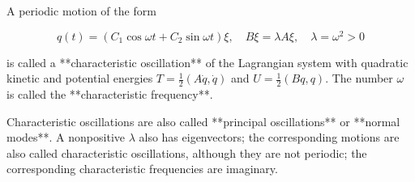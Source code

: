 A periodic motion of the form

$$q(t) = (C_1 \cos \omega t + C_2 \sin \omega t) \xi, \quad B\xi = \lambda A\xi, \quad \lambda = \omega^2 > 0$$

is called a **characteristic oscillation** of the Lagrangian system with quadratic kinetic and potential energies $T = \frac{1}{2}(A\dot{q}, \dot{q})$ and $U = \frac{1}{2}(Bq, q)$. The number $\omega$ is called the **characteristic frequency**.

Characteristic oscillations are also called **principal oscillations** or **normal modes**. A nonpositive $\lambda$ also has eigenvectors; the corresponding motions are also called characteristic oscillations, although they are not periodic; the corresponding characteristic frequencies are imaginary.
